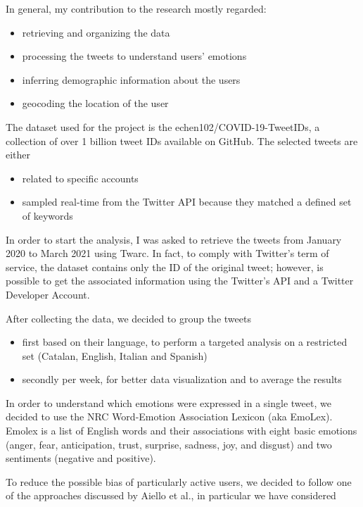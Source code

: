 In general, my contribution to the research mostly regarded:

\begin{itemize}
	\item retrieving and organizing the data
	\item processing the tweets to understand users' emotions
	\item inferring demographic information about the users
	\item geocoding the location of the user
\end{itemize}

The dataset used for the project is the echen102/COVID-19-TweetIDs, a collection of over 1 billion tweet IDs available on GitHub. The selected tweets are either

\begin{itemize}
	\item related to specific accounts
	\item sampled real-time from the Twitter API because they matched a defined set of keywords
\end{itemize}

In order to start the analysis, I was asked to retrieve the tweets from January 2020 to March 2021 using Twarc. In fact, to comply with Twitter's term of service, the dataset contains only the ID of the original tweet; however, is possible to get the associated information using the Twitter's API and a Twitter Developer Account.

After collecting the data, we decided to group the tweets 

\begin{itemize}
	\item first based on their language, to perform a targeted analysis on a restricted set (Catalan, English, Italian and Spanish)
	\item secondly per week, for better data visualization and to average the results
\end{itemize}

In order to understand which emotions were expressed in a single tweet, we decided to use the NRC Word-Emotion Association Lexicon (aka EmoLex). Emolex is a list of English words and their associations with eight basic emotions (anger, fear, anticipation, trust, surprise, sadness, joy, and disgust) and two sentiments (negative and positive).

To reduce the possible bias of particularly active users, we decided to follow one of the approaches discussed by Aiello et al., in particular we have considered
	
